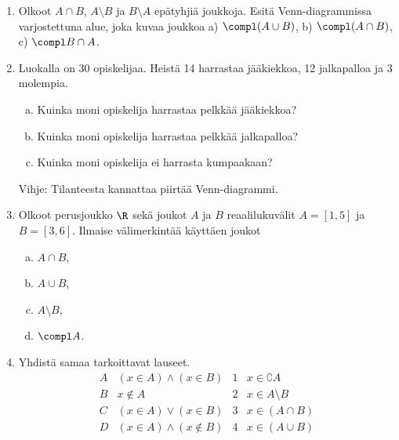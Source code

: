 \begin{enumerate}
\begin{center}



\end{center}

\item
Olkoot $A \cap B$, $A \setminus B$ ja $B \setminus A$ epätyhjiä joukkoja. Esitä Venn-diagrammissa varjostettuna alue, joka kuvaa joukkoa a) $\compl (A \cup B)$, b) $\compl (A \cap B)$, c) $\compl B \cap A$.

\item Luokalla on 30 opiskelijaa. Heistä 14 harrastaa jääkiekkoa, 12 jalkapalloa ja 3 molempia. 
\begin{enumerate}[a)]
\item Kuinka moni opiskelija harrastaa pelkkää jääkiekkoa?
\item Kuinka moni opiskelija harrastaa pelkkää jalkapalloa?
\item Kuinka moni opiskelija ei harrasta kumpaakaan?
\end{enumerate}
Vihje: Tilanteesta kannattaa piirtää Venn-diagrammi.

\item Olkoot perusjoukko $\R$ sekä joukot $A$ ja $B$ reaalilukuvälit $A=[1,5]$ ja $B=[3,6]$. Ilmaise välimerkintää käyttäen joukot
\begin{enumerate}[a)]
\item $A \cap B$,
\item $A \cup B$,
\item $A \setminus B$,
\item $\compl A$.
\end{enumerate}

\item Yhdistä samaa tarkoittavat lauseet.
\[
\begin{array}{llll}
A & (x\in A)\land (x\in B) & 1 & x\in \complement A \\
B & x\notin A & 2 & x \in A\setminus B \\
C & (x\in A)\lor (x\in B) & 3 & x\in (A\cap B) \\
D & (x\in A)\land (x\notin B) & 4 & x\in (A\cup B)
\end{array}
\]
\newpage


\end{enumerate}
